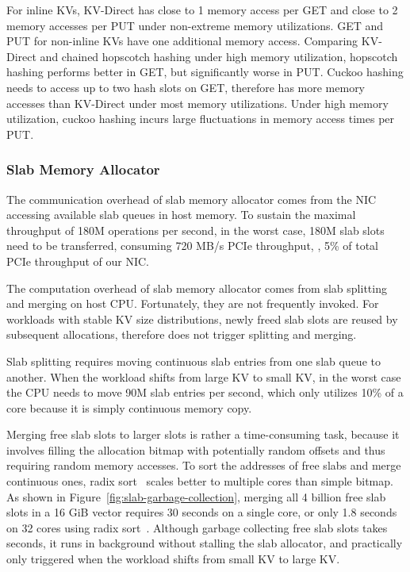 For inline KVs, KV-Direct has close to 1 memory access per GET and close to 2 memory accesses per PUT under non-extreme memory utilizations.
GET and PUT for non-inline KVs have one additional memory access.
Comparing KV-Direct and chained hopscotch hashing under high memory utilization, hopscotch hashing performs better in GET, but significantly worse in PUT.
Cuckoo hashing needs to access up to two hash slots on GET, therefore has more memory accesses than KV-Direct under most memory utilizations.
Under high memory utilization, cuckoo hashing incurs large fluctuations in memory access times per PUT.


\subsubsection{Slab Memory Allocator}
\label{sec:slab-eval}

The communication overhead of slab memory allocator comes from the NIC accessing available slab queues in host memory.
To sustain the maximal throughput of 180M operations per second, in the worst case, 180M slab slots need to be transferred, consuming 720 MB/s PCIe throughput, \ie, 5\% of total PCIe throughput of our NIC.

The computation overhead of slab memory allocator comes from slab splitting and merging on host CPU.
Fortunately, they are not frequently invoked.
For workloads with stable KV size distributions, newly freed slab slots are reused by subsequent allocations, therefore does not trigger splitting and merging.

Slab splitting requires moving continuous slab entries from one slab queue to another. When the workload shifts from large KV to small KV, in the worst case the CPU needs to move 90M slab entries per second, which only utilizes 10\% of a core because it is simply continuous memory copy.

Merging free slab slots to larger slots is rather a time-consuming task, because it involves filling the allocation bitmap with potentially random offsets and thus requiring random memory accesses.
To sort the addresses of free slabs and merge continuous ones, radix sort~\cite{satish2010fast} scales better to multiple cores than simple bitmap.
As shown in Figure~\ref{fig:slab-garbage-collection}, merging all 4 billion free slab slots in a 16 GiB vector requires 30 seconds on a single core, or only 1.8 seconds on 32 cores using radix sort~\cite{satish2010fast}.
Although garbage collecting free slab slots takes seconds, it runs in background without stalling the slab allocator, and practically only triggered when the workload shifts from small KV to large KV.

